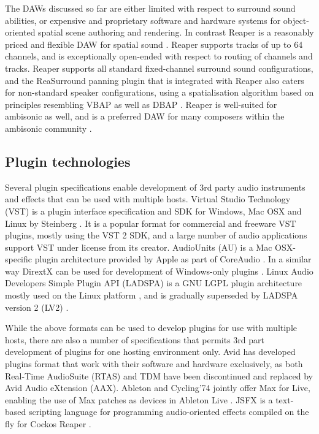 \documentclass{article}
\begin{document}
The DAWs discussed so far are either limited with respect to surround sound abilities, or expensive and proprietary software and hardware systems for object-ori\-ented spatial scene authoring and rendering.
In contrast Reaper is a reasonably priced and flexible DAW for spatial sound \cite{cockos:2014reaper}.
Reaper supports tracks of up to 64 channels, and is exceptionally open-ended with respect to routing of channels and tracks.
Reaper supports all standard fixed-channel surround sound configurations, and the ReaSurround panning plugin that is integrated with Reaper also caters for non-standard speaker configurations, using a spatialisation algorithm based on principles resembling VBAP \cite{Pulkki:1997vbap} as well as DBAP \cite{Lossius:2009dbap}.
Reaper is well-suited for ambisonic as well, and is a preferred DAW for many composers within the ambisonic  community \cite{wiggins:2012reaperhowto}.





\subsection{Plugin technologies}\label{sec:plugin-technologies}

Several plugin specifications enable development of 3rd party audio instruments and effects that can be used with multiple hosts.
Virtual Studio Technology (VST) is a plugin interface specification and SDK for Windows, Mac OSX and Linux by Steinberg \cite{steinberg:2014vst}.
It is a popular format for commercial and freeware VST plugins, mostly using the VST 2 SDK, and a large number of audio applications support VST under license from its creator.
AudioUnits (AU) is a Mac OSX-specific plugin architecture provided by Apple as part of CoreAudio \cite{apple2014:au}.
In a similar way DirextX can be used for development of Windows-only plugins \cite{microsoft2014:directX}.
Linux Audio Developers Simple Plugin API (LADSPA) is a GNU LGPL plugin architecture mostly used on the Linux platform \cite{furse:2007ladspa}, and is gradually superseded by LADSPA version 2 (LV2) \cite{lv2:2014}.

While the above formats can be used to develop plugins for use with multiple hosts, there are also a number of specifications that permits 3rd part development of plugins for one hosting environment only.
Avid has developed plugins format that work with their software and hardware exclusively, as both Real-Time AudioSuite (RTAS) and TDM have been discontinued and replaced by Avid Audio eXtension (AAX).
Ableton and Cycling'74 jointly offer Max for Live, enabling the use of Max patches as devices in Ableton Live \cite{ableton:2014maxforlive}. JSFX is a text-based scripting language for programming audio-oriented effects compiled on the fly for Cockos Reaper \cite{cockos:2014jsfx,cockos:2014reaper}.
\end{document}
